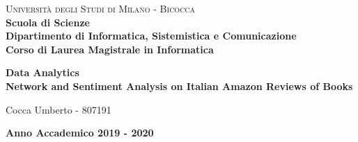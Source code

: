 \documentclass[a4paper,12pt]{article}
\renewcommand{\baselinestretch}{1.5}
\begin{document}
\begin{titlepage}
\noindent
    \vspace*{5mm}
	\begin{minipage}[t]{0.15\textwidth}
	    \vspace*{5mm}
	\end{minipage}
	\hspace{1cm}
	\begin{minipage}[t]{0.9\textwidth}
	      \vspace*{5mm}
		{
			{\textsc{Università degli Studi di Milano - Bicocca} } \\
			\textbf{Scuola di Scienze} \\
			\textbf{Dipartimento di Informatica, Sistemistica e Comunicazione} \\
			\textbf{Corso di Laurea Magistrale in Informatica} \\
			\par
		}
	\end{minipage}
	
	\vspace{42mm}

\begin{center}
    {\LARGE{
            \textbf{
            	Data Analytics \\ 
            	Network and Sentiment Analysis on Italian Amazon Reviews of Books}
    }}        
\end{center}

\vspace{40mm}
	
	
	\begin{flushright}
		\large{Cocca Umberto - 807191} 
	\end{flushright}
	
	\vspace{15mm}
	\begin{center}
		{\large{\bf Anno Accademico 2019 - 2020}}
	\end{center}


\renewcommand{\baselinestretch}{1.5}

\end{titlepage}
\end{document}
